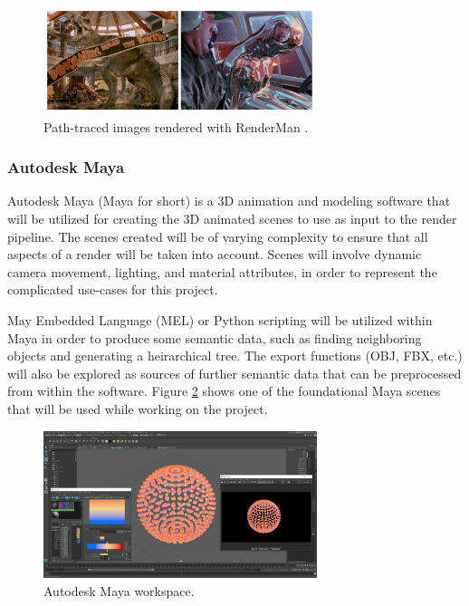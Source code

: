 \documentclass[conference]{IEEEtran}
\begin{document}
\begin{figure}[htbp]
\centerline{\includegraphics[width=8cm]{renderman.png}}
\caption{Path-traced images rendered with RenderMan \cite{renderman}.}
\label{fig:renderman}
\end{figure}

\subsubsection{Autodesk Maya}
Autodesk Maya (Maya for short) is a 3D animation and modeling software that will be utilized
for creating the 3D animated scenes to use as input to the render pipeline.
The scenes created will be of varying complexity to ensure that all aspects of a
render will be taken into account.
Scenes will involve dynamic camera movement, lighting, and material attributes, in order
to represent the complicated use-cases for this project.

May Embedded Language (MEL) or Python scripting
will be utilized within Maya in order to produce some semantic data, such as finding neighboring
objects and generating a heirarchical tree. The export functions (OBJ, FBX, etc.) will also be explored
as sources of further semantic data that can be preprocessed from within the software.
Figure \ref{fig:maya} shows one of the foundational Maya scenes that will be used
while working on the project.

\begin{figure}[htbp]
\centerline{\includegraphics[width=8cm]{maya.png}}
\caption{Autodesk Maya workspace.}
\label{fig:maya}
\end{figure}
\end{document}
